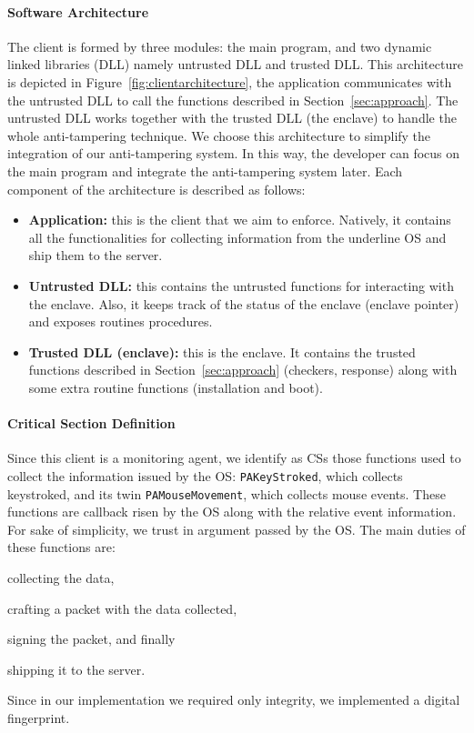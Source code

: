 \paragraph{\textbf{Software Architecture}}
The client is formed by three modules: the main program, and two dynamic linked 
libraries (DLL) namely untrusted DLL and trusted DLL. %
This architecture is depicted in Figure~\ref{fig:clientarchitecture},
the application communicates with the untrusted DLL to call the functions 
described in Section~\ref{sec:approach}.
The untrusted DLL works together with the trusted DLL (\ie the enclave) to 
handle the whole anti-tampering technique.
We choose this architecture to
simplify the integration of our anti-tampering system.
In this way, the developer can focus on the main program
and integrate the anti-tampering system later.
Each component of the architecture is described as follows:
\begin{itemize}
	\item \textbf{Application:} this is the client that we aim to enforce. 
	Natively, 
	it contains all the functionalities for collecting information from the 
	underline OS and ship them to the server.
	\item \textbf{Untrusted DLL:} this contains the untrusted functions for 
	interacting with the enclave. Also, it keeps track of the status of the 
	enclave (\ie enclave pointer) and exposes routines procedures.
	\item \textbf{Trusted DLL (enclave):} this is the enclave. It contains the 
	trusted functions described in Section~\ref{sec:approach} (\eg checkers, 
	response) along with some extra routine functions (\ie installation and 
	boot).
\end{itemize}

\paragraph{\textbf{Critical Section Definition}}
Since this client is a monitoring agent, we identify as CSs those
functions used to collect the information issued by the OS:
\texttt{PAKeyStroked}, which collects keystroked, and its twin 
\texttt{PAMouseMovement},
which collects mouse events.
These functions are callback risen by the OS along with the relative event 
information.
For sake of simplicity, we trust in argument passed by the OS.
The main duties of these functions are:
\begin{enumerate*}[label=(\roman*)]
	\item collecting the data,
	\item crafting a packet with the data collected,
	\item signing the packet, and finally
	\item shipping it to the server.
\end{enumerate*}
Since in our implementation we required only integrity, we implemented a 
digital fingerprint.

